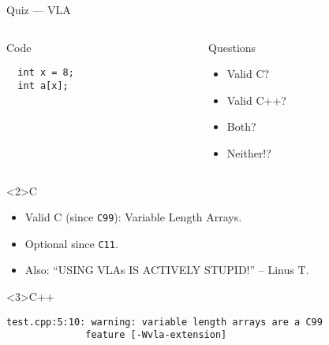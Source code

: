 \documentclass[presentation,aspectratio=169]{beamer}
\begin{document}
\begin{frame}[fragile,label={sec:org23c4234}]{Quiz — VLA}
 \begin{columns}
\begin{column}{0.48\columnwidth}
\begin{block}{Code}
\begin{verbatim}
  int x = 8;
  int a[x];
\end{verbatim}
\end{block}
\end{column}

\begin{column}{0.48\columnwidth}
\begin{block}{Questions}
\begin{itemize}
\item Valid C?
\item Valid C++?
\item Both?
\item Neither!?
\end{itemize}
\end{block}
\end{column}
\end{columns}

\begin{block}<2>{C}
\begin{itemize}
\item Valid C (since \texttt{C99}): Variable Length Arrays.
\item Optional since \texttt{C11}.
\item Also: ``USING VLAs IS ACTIVELY STUPID!'' -- Linus T.
\end{itemize}
\end{block}

\vspace{-2cm}
\begin{block}<3>{C++}
\begin{verbatim}
test.cpp:5:10: warning: variable length arrays are a C99
              feature [-Wvla-extension]
\end{verbatim}
\end{block}
\end{frame}

\end{document}
